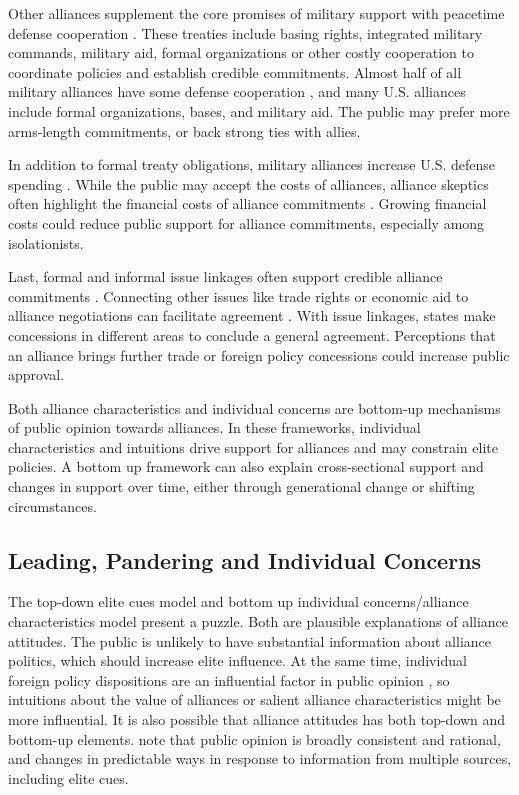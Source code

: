 \documentclass[12pt]{article}
\begin{document}
Other alliances supplement the core promises of military support with peacetime defense cooperation \citep{Morrow1994, LeedsAnac2005}. 
These treaties include basing rights, integrated military commands, military aid, formal organizations or other costly cooperation to coordinate policies and establish credible commitments.
Almost half of all military alliances have some defense cooperation \citep{Leedsetal2002}, and many U.S. alliances include formal organizations, bases, and military aid. 
The public may prefer more arms-length commitments, or back strong ties with allies. 


In addition to formal treaty obligations, military alliances increase U.S. defense spending \citep{AlleyFuhrmann2021}. 
While the public may accept the costs of alliances, alliance skeptics often highlight the financial costs of alliance commitments \citep{Posen2014}. 
Growing financial costs could reduce public support for alliance commitments, especially among isolationists. 


Last, formal and informal issue linkages often support credible alliance commitments \citep{Poast2013}. 
Connecting other issues like trade rights or economic aid to alliance negotiations can facilitate agreement \citep{Poast2012}.
With issue linkages, states make concessions in different areas to conclude a general agreement. 
Perceptions that an alliance brings further trade or foreign policy concessions could increase public approval.  


Both alliance characteristics and individual concerns are bottom-up mechanisms of public opinion towards alliances. 
In these frameworks, individual characteristics and intuitions drive support for alliances and may constrain elite policies. 
A bottom up framework can also explain cross-sectional support and changes in support over time, either through generational change or shifting circumstances. 
 


\subsection{Leading, Pandering and Individual Concerns}


The top-down elite cues model and bottom up individual concerns/alliance characteristics model present a puzzle. 
Both are plausible explanations of alliance attitudes. 
The public is unlikely to have substantial information about alliance politics, which should increase elite influence. 
At the same time, individual foreign policy dispositions are an influential factor in public opinion \citep{Herrmannetal2009, KertzerZeitzoff2017}, so intuitions about the value of alliances or salient alliance characteristics might be more influential. 
It is also possible that alliance attitudes has both top-down and bottom-up elements. 
\citet{PageShapiro1992} note that public opinion is broadly consistent and rational, and changes in predictable ways in response to information from multiple sources, including elite cues. 
\end{document}
